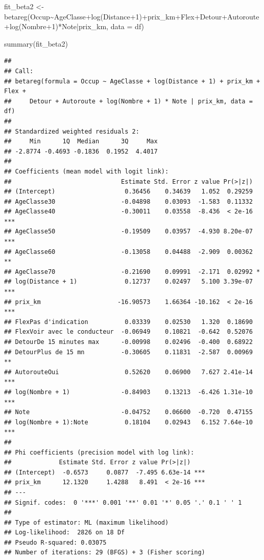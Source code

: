 \documentclass[
]{book}
\newenvironment{Shaded}{\begin{snugshade}}{\end{snugshade}}
\newcommand{\AttributeTok}[1]{\textcolor[rgb]{0.77,0.63,0.00}{#1}}
\newcommand{\DecValTok}[1]{\textcolor[rgb]{0.00,0.00,0.81}{#1}}
\newcommand{\FunctionTok}[1]{\textcolor[rgb]{0.00,0.00,0.00}{#1}}
\newcommand{\NormalTok}[1]{#1}
\newcommand{\OtherTok}[1]{\textcolor[rgb]{0.56,0.35,0.01}{#1}}
\newcommand{\SpecialCharTok}[1]{\textcolor[rgb]{0.00,0.00,0.00}{#1}}
\begin{document}
\begin{Shaded}
\begin{Highlighting}[]
\NormalTok{fit\_beta2 }\OtherTok{\textless{}{-}} \FunctionTok{betareg}\NormalTok{(Occup}\SpecialCharTok{\textasciitilde{}}\NormalTok{AgeClasse}\SpecialCharTok{+}\FunctionTok{log}\NormalTok{(Distance}\SpecialCharTok{+}\DecValTok{1}\NormalTok{)}\SpecialCharTok{+}\NormalTok{prix\_km}\SpecialCharTok{+}\NormalTok{Flex}\SpecialCharTok{+}\NormalTok{Detour}\SpecialCharTok{+}\NormalTok{Autoroute}\SpecialCharTok{+}\FunctionTok{log}\NormalTok{(Nombre}\SpecialCharTok{+}\DecValTok{1}\NormalTok{)}\SpecialCharTok{*}\NormalTok{Note}\SpecialCharTok{|}\NormalTok{prix\_km, }\AttributeTok{data =}\NormalTok{ df)}


\FunctionTok{summary}\NormalTok{(fit\_beta2)}
\end{Highlighting}
\end{Shaded}

\begin{verbatim}
## 
## Call:
## betareg(formula = Occup ~ AgeClasse + log(Distance + 1) + prix_km + Flex + 
##     Detour + Autoroute + log(Nombre + 1) * Note | prix_km, data = df)
## 
## Standardized weighted residuals 2:
##     Min      1Q  Median      3Q     Max 
## -2.8774 -0.4693 -0.1836  0.1952  4.4017 
## 
## Coefficients (mean model with logit link):
##                              Estimate Std. Error z value Pr(>|z|)    
## (Intercept)                   0.36456    0.34639   1.052  0.29259    
## AgeClasse30                  -0.04898    0.03093  -1.583  0.11332    
## AgeClasse40                  -0.30011    0.03558  -8.436  < 2e-16 ***
## AgeClasse50                  -0.19509    0.03957  -4.930 8.20e-07 ***
## AgeClasse60                  -0.13058    0.04488  -2.909  0.00362 ** 
## AgeClasse70                  -0.21690    0.09991  -2.171  0.02992 *  
## log(Distance + 1)             0.12737    0.02497   5.100 3.39e-07 ***
## prix_km                     -16.90573    1.66364 -10.162  < 2e-16 ***
## FlexPas d'indication          0.03339    0.02530   1.320  0.18690    
## FlexVoir avec le conducteur  -0.06949    0.10821  -0.642  0.52076    
## DetourDe 15 minutes max      -0.00998    0.02496  -0.400  0.68922    
## DetourPlus de 15 mn          -0.30605    0.11831  -2.587  0.00969 ** 
## AutorouteOui                  0.52620    0.06900   7.627 2.41e-14 ***
## log(Nombre + 1)              -0.84903    0.13213  -6.426 1.31e-10 ***
## Note                         -0.04752    0.06600  -0.720  0.47155    
## log(Nombre + 1):Note          0.18104    0.02943   6.152 7.64e-10 ***
## 
## Phi coefficients (precision model with log link):
##             Estimate Std. Error z value Pr(>|z|)    
## (Intercept)  -0.6573     0.0877  -7.495 6.63e-14 ***
## prix_km      12.1320     1.4288   8.491  < 2e-16 ***
## ---
## Signif. codes:  0 '***' 0.001 '**' 0.01 '*' 0.05 '.' 0.1 ' ' 1 
## 
## Type of estimator: ML (maximum likelihood)
## Log-likelihood:  2826 on 18 Df
## Pseudo R-squared: 0.03075
## Number of iterations: 29 (BFGS) + 3 (Fisher scoring)
\end{verbatim}
\end{document}
